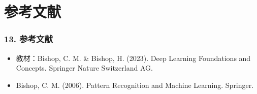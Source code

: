 \documentclass[t,aspectratio=169]{beamer} %
\begin{document}
\section{参考文献}

\begin{frame}
    \frametitle{13. 参考文献}
    \begin{itemize}
        \item 教材：Bishop, C. M. \& Bishop, H. (2023). Deep Learning Foundations and Concepts. Springer Nature Switzerland AG.
        \item Bishop, C. M. (2006). Pattern Recognition and Machine Learning. Springer.
    \end{itemize}
\end{frame}
\end{document}
